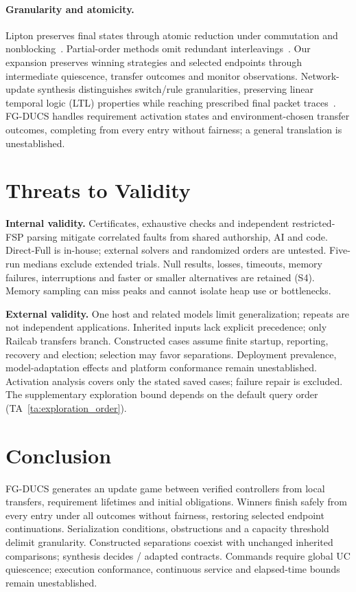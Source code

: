 \documentclass[acmsmall,screen,review,anonymous]{acmart}
\begin{document}
\paragraph{Granularity and atomicity.}
Lipton preserves final states through atomic reduction under commutation and nonblocking~\cite[Sec.~3]{Lipton1975Reduction}. Partial-order methods omit redundant interleavings~\cite[Secs.~4--5]{Godefroid1991PartialOrders}. Our expansion preserves winning strategies and selected endpoints through intermediate quiescence, transfer outcomes and monitor observations. Network-update synthesis distinguishes switch/rule granularities, preserving linear temporal logic (LTL) properties while reaching prescribed final packet traces~\cite[Secs.~3.1--3.2, 4.3]{McClurgEtAl2015NetworkUpdates}. FG-DUCS handles requirement activation states and environment-chosen transfer outcomes, completing from every entry without fairness; a general translation is unestablished.

\section{Threats to Validity}
\label{sec:threats}
\noindent\textbf{Internal validity.}
Certificates, exhaustive checks and independent restricted-FSP parsing mitigate correlated faults from shared authorship, AI and code. Direct-Full is in-house; external solvers and randomized orders are untested. Five-run medians exclude extended trials. Null results, losses, timeouts, memory failures, interruptions and faster or smaller alternatives are retained (S4). Memory sampling can miss peaks and cannot isolate heap use or bottlenecks.

\noindent\textbf{External validity.}
One host and related models limit generalization; repeats are not independent applications. Inherited inputs lack explicit precedence; only Railcab transfers branch. Constructed cases assume finite startup, reporting, recovery and election; selection may favor separations. Deployment prevalence, model-adaptation effects and platform conformance remain unestablished. Activation analysis covers only the stated saved cases; failure repair is excluded. The supplementary exploration bound depends on the default query order (TA~\ref{ta:exploration_order}).

\section{Conclusion}
\label{sec:conclusion}
FG-DUCS generates an update game between verified controllers from local transfers, requirement lifetimes and initial obligations. Winners finish safely from every entry under all outcomes without fairness, restoring selected endpoint continuations. Serialization conditions, obstructions and a capacity threshold delimit granularity. Constructed separations coexist with \VThreeEOneTrials{} unchanged inherited comparisons; synthesis decides \LazyDecisions{}/\ApplicationContracts{} adapted contracts. Commands require global UC quiescence; execution conformance, continuous service and elapsed-time bounds remain unestablished.
\end{document}
